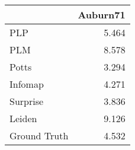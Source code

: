 \begin{tabular}{lr}
\toprule
{} & Auburn71 \\
\midrule
PLP          &    5.464 \\
PLM          &    8.578 \\
Potts        &    3.294 \\
Infomap      &    4.271 \\
Surprise     &    3.836 \\
Leiden       &    9.126 \\
Ground Truth &    4.532 \\
\bottomrule
\end{tabular}

